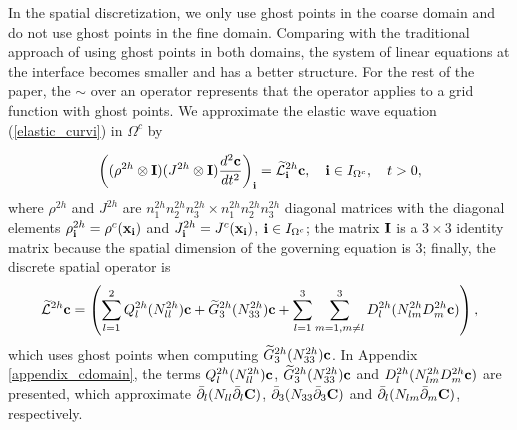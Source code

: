 In the spatial discretization, we only use ghost points in the coarse domain and do not use ghost points in the fine domain. Comparing with the traditional approach of using ghost points in both domains, the system of linear equations at the interface becomes smaller and has a better structure. For the rest of the paper, the $\sim$ over an operator represents that the operator applies to a grid function with ghost points. We approximate the elastic wave equation (\ref{elastic_curvi}) in $\Omega^c$ by
{%
\begin{equation}\label{elastic_semi_c}
\left(({\rho}^{2h}\otimes{\bf I})(J^{2h}\otimes {\bf I})\frac{d^2{{\bf c}}}{dt^2}\right)_{\bf i} = \widetilde{\mathcal{L}}^{2h}_{\bf i} {{\bf c}},\quad {\bf i}\in I_{\Omega^c},\quad t>0,
\end{equation}
where $\rho^{2h}$ and $J^{2h}$ are $n_1^{2h}n_2^{2h}n_3^{2h}\times n_1^{2h}n_2^{2h}n_3^{2h}$ diagonal matrices with the diagonal elements $\rho^{2h}_{\bf i} = \rho^c({\bf x}_{\bf i})$ and $J^{2h}_{\bf i} = J^c({\bf x}_{\bf i})$, ${\bf i}\in I_{\Omega^c}$; the matrix ${\bf I}$ is a $3\times 3$ identity matrix because the spatial dimension of the governing equation is $3$; finally, the discrete spatial operator is
\begin{equation}\label{L_operator}
\widetilde{\mathcal{L}}^{2h} {{\bf c}} = \left(\sum_{l=1}^2{Q}_l^{2h}({N}_{ll}^{2h}){\bf c}+\widetilde{{G}}_3^{2h}({N}_{33}^{2h}){{\bf c}}+\sum_{l=1}^3\sum_{m=1,m\neq l}^3{D}_l^{2h}({N}_{lm}^{2h}{D}_m^{2h}{\bf c})\right),
\end{equation}
which uses ghost points when computing $\widetilde{G}_3^{2h}(N^{2h}_{33}){\bf c}$. %
In Appendix \ref{appendix_cdomain}, the terms $Q_l^{2h}(N_{ll}^{2h}){\bf c}$, $\widetilde{G}_3^{2h}(N_{33}^{2h}){\bf c}$ and $D_{l}^{2h}(N_{lm}^{2h}D_m^{2h}{\bf c})$ are presented, which approximate $\bar{\partial}_l(N_{ll}\bar{\partial}_l{\bf C})$, $\bar{\partial}_3(N_{33}\bar{\partial}_3 {\bf C})$ and $\bar{\partial}_l(N_{lm}\bar{\partial}_m {\bf C})$, respectively.

}

